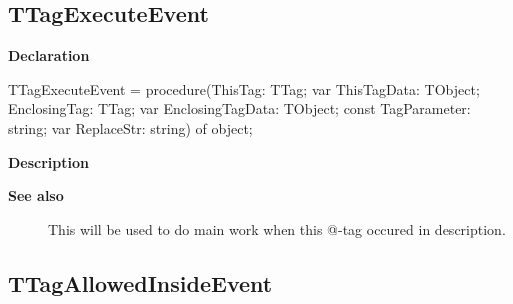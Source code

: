 \documentclass{report}
\newif\ifpdf
\begin{document}
\subsection*{TTagExecuteEvent}
\fi
\label{PasDoc_TagManager-TTagExecuteEvent}
\begin{list}{}{
\setlength{\itemindent}{0cm}
\setlength{\listparindent}{0cm}
\setlength{\leftmargin}{\evensidemargin}
\addtolength{\leftmargin}{\tmplength}
\settowidth{\labelsep}{X}
\addtolength{\leftmargin}{\labelsep}
\setlength{\labelwidth}{\tmplength}
}
\item[\textbf{Declaration}\hfill]
\ifpdf
\begin{flushleft}
\fi
\begin{ttfamily}
TTagExecuteEvent = procedure(ThisTag: TTag; var ThisTagData: TObject; EnclosingTag: TTag; var EnclosingTagData: TObject; const TagParameter: string; var ReplaceStr: string) of object;\end{ttfamily}

\ifpdf
\end{flushleft}
\fi

\par
\item[\textbf{Description}]
 \item[\textbf{See also}]
\begin{description}
\item[\begin{ttfamily}TTag.Execute\end{ttfamily}(\ref{PasDoc_TagManager.TTag-Execute})] 
This will be used to do main work when this @{-}tag occured in description.
\end{description}


\end{list}
\ifpdf
\subsection*{\large{\textbf{TTagAllowedInsideEvent}}\normalsize\hspace{1ex}\hrulefill}
\else
\end{document}

